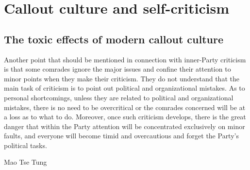   \chapter{Callout culture and self-criticism}
	\section{The toxic effects of modern callout culture}
    	\epigraph{Another point that should be mentioned in connection with inner-Party criticism is that some comrades ignore the major issues and confine their attention to minor points when they make their criticism. They do not understand that the main task of criticism is to point out political and organizational mistakes. As to personal shortcomings, unless they are related to political and organizational mistakes, there is no need to be overcritical or the comrades concerned will be at a loss as to what to do. Moreover, once such criticism develops, there is the great danger that within the Party attention will be concentrated exclusively on minor faults, and everyone will become timid and overcautious and forget the Party's political tasks.}{Mao Tse Tung}
